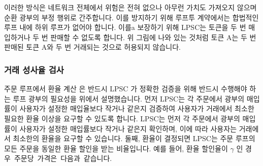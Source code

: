 \documentclass{article}
\makeatletter
\newenvironment{figurehere}
{\def\@captype{figure}}
\makeatother
\begin{document}
\begin{multicols}{2}
\begin{center}
\begin{figurehere}
		
		\label{fig:subring}
	\end{figurehere}
\end{center}

\indent 이러한 방식은 네트워크 전체에서 위험은 전혀 없으나 아무런 가치도 가져오지 않으며 순환 광부의 부정 행위로 간주합니다. 이를 방지하기 위해 루프투 계약에서는 합법적인 루프 내에 하위 루프가 없어야 합니다. 이를a 보장하기 위해 LPSC는 토큰을 두 번 매입하거나 두 번 판매할 수 없도록 합니다. 위 그림에 나와 있는 것처럼 토큰 A는 두 번 판매된 토큰 A와 두 번 거래되는 것으로 허용되지 않습니다.

\subsubsection{거래 성사율 검사\label{sec:fill_rate_check}}


\indent 주문 루프에서 환율 계산 은 반드시 LPSC 가 정확한 검증을 위해 반드시 수행해야 하는 루프 광부의 필요성을 위에서 설명했습니다. 먼저 LPSC는 각 주문에서 광부의 매입률이 사용자가 설정한 매입율보다 작거나 같은지 검증하여 사용자가 거래에서 최소한 필요한 환율 이상을 요구할 수 있도록 합니다. LPSC는 먼저 각 주문에서 광부의 매입률이 사용자가 설정한 매입률보다 작거나 같은지 확인하며, 이에 따라 사용자는 거래에서 최소한의 환율을 요구할 수 있습니다. 둘째, 환율이 결정되면 LPSC는 주문 루프의 모든 주문을 동일한 환율 할인을 받는 비율입니다. 예를 들어, 환율 할인율이 $\gamma$ 인 경우\ 주문당\ 가격은\ 다음과\ 같습니다.


\end{multicols}
\end{document}
